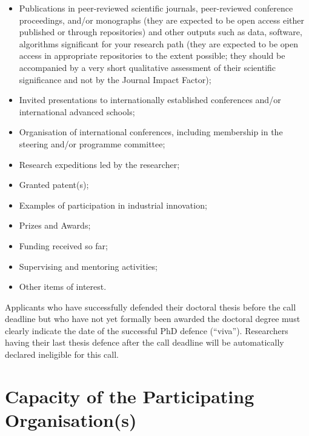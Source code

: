 \documentclass[11pt,draftproposal]{msca-pf}
\begin{document}
\begin{itemize}
    \item Publications in peer-reviewed scientific journals, peer-reviewed conference
    proceedings,  and/or monographs (they are expected to be open access either
    published or through repositories) and other outputs such as data, software,
    algorithms significant for your research path (they are expected to be open
    access in appropriate repositories to the extent possible; they should be
    accompanied by a very short qualitative assessment of their scientific
    significance and not by the Journal Impact Factor);

    \item Invited presentations to internationally established conferences and/or
    international advanced schools;

    \item Organisation of international conferences, including membership in
    the steering and/or programme committee;

    \item Research expeditions led by the researcher;

    \item Granted patent(s);

    \item Examples of participation in industrial innovation;

    \item Prizes and Awards;

    \item Funding received so far;

    \item Supervising and mentoring activities;

    \item Other items of interest.
\end{itemize}

Applicants who have successfully defended their doctoral thesis before the call
deadline but who have not yet formally been awarded the doctoral degree must
clearly indicate the date of the successful PhD defence (``viva''). Researchers
having their last thesis defence after the call deadline will be automatically
declared ineligible for this call.

\section{Capacity of the Participating Organisation(s)}
\end{document}
